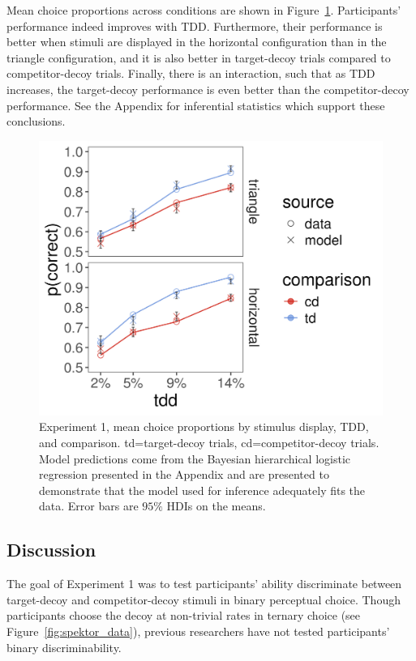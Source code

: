 Mean choice proportions across conditions are shown in Figure~\ref{fig:e1_data}. Participants' performance indeed improves with TDD. Furthermore, their performance is better when stimuli are displayed in the horizontal configuration than in the triangle configuration, and it is also better in target-decoy trials compared to competitor-decoy trials. Finally, there is an interaction, such that as TDD increases, the target-decoy performance is even better than the competitor-decoy performance. See the Appendix for inferential statistics which support these conclusions.

\begin{figure}
   \includegraphics[width=\textwidth]{figures/m14_model_preds_v_data.jpeg}
   \caption{Experiment 1, mean choice proportions by stimulus display, TDD, and comparison. td=target-decoy trials, cd=competitor-decoy trials. Model predictions come from the Bayesian hierarchical logistic regression presented in the Appendix and are presented to demonstrate that the model used for inference adequately fits the data. Error bars are $95\%$ HDIs on the means.}
   \label{fig:e1_data}
\end{figure}

\subsection{Discussion}

The goal of Experiment 1 was to test participants' ability discriminate between target-decoy and competitor-decoy stimuli in binary perceptual choice. Though participants choose the decoy at non-trivial rates in ternary choice (see Figure~\ref{fig:spektor_data}), previous researchers have not tested participants' binary discriminability. 

